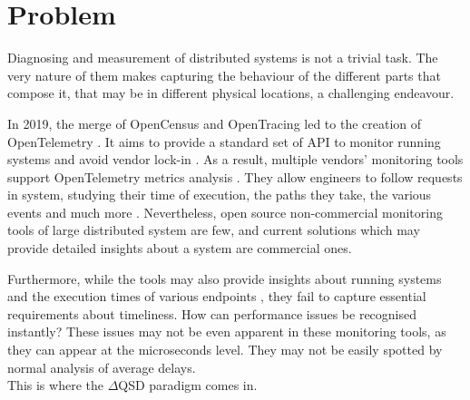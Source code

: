 \section{Problem}
    Diagnosing and measurement of distributed systems is not a trivial task. The very nature of them makes capturing the behaviour of the different parts that compose it, that may be in different physical locations, a challenging endeavour. \cite{dist-m}

    In 2019, the merge of OpenCensus and OpenTracing led to the creation of OpenTelemetry \cite{openc}. It aims to provide a standard set of API to monitor running systems and avoid vendor lock-in \cite{otel-v}. As a result, multiple vendors' monitoring tools support OpenTelemetry metrics analysis \cite{otel-ven}. They allow engineers to follow requests in system, studying their time of execution, the paths they take, the various events and much more \cite{zipkin} \cite{otel-t}. Nevertheless, open source non-commercial monitoring tools of large distributed system are few, and current solutions which may provide detailed insights about a system are commercial ones. \cite{otel-aw} 

    Furthermore, while the tools may also provide insights about running systems and the execution times of various endpoints \cite{jag-spm}, they fail to capture essential requirements about timeliness. How can performance issues be recognised instantly? These issues may not be even apparent in these monitoring tools, as they can appear at the microseconds level. They may not be easily spotted by normal analysis of average delays. \\
    This is where the $\Delta$QSD paradigm comes in.



